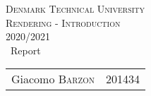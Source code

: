 \begin{titlepage} %
	\begin{center} %

		
		\textsc{\LARGE Denmark Technical University}\\[1.5cm]
		
		\textsc{\Large Rendering - Introduction}\\[0.5cm]
		
		\textsc{\large 2020/2021}\\[0.5cm] %
		
		
		{\huge\ Report}\\[0.4cm] %
		
		
	 	\large
			\begin{tabular}{l r}
				Giacomo \textsc{Barzon} & 201434 \\
			\end{tabular}
	\end{center}
\end{titlepage}
